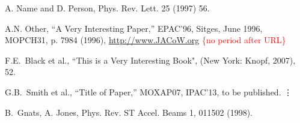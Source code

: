 \documentclass[acus]{jacow}
\begin{document}


\newpage
\raggedend 

\begin{thebibliography}{99}   %


	A. Name and D. Person,
	Phys. Rev. Lett. 25 (1997) 56.

	A.N. Other,
	``A Very Interesting Paper,''
	EPAC'96, Sitges, June 1996, MOPCH31, p. 7984 (1996),
	\url{http://www.JACoW.org}  \hfill\textcolor{red}{\{no period after URL\}}

	F.E.~Black et al.,
	``This is a Very Interesting Book",
	(New York: Knopf, 2007), 52.

	G.B.~Smith et al.,
	``Title of Paper,'' MOXAP07, IPAC'13,
	to be published.\newline
	\hspace*{-1.1em}\mbox{\vdots}

\addtocounter{enumi}{5}
	B.~Gnats, A. Jones,
	Phys. Rev. ST Accel. Beams 1, 011502 (1998).

\end{thebibliography}
\end{document}
